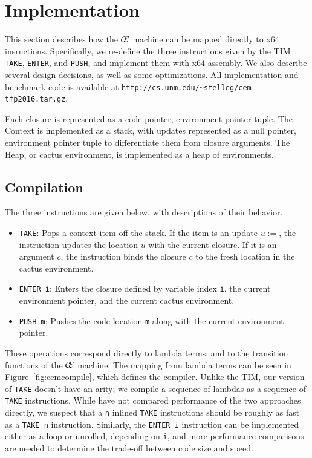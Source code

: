 \section{Implementation} \label{sec:impl}

This section describes how the $\mathcal{\mathcal{C} \mskip -4mu \mathcal{E}}$ machine can be mapped directly to
x64 insructions. Specifically, we re-define the three instructions given by
the TIM~\cite{TIM}: \texttt{TAKE}, \texttt{ENTER}, and \texttt{PUSH}, and
implement them with x64 assembly. We also describe several design decisions, as
well as some optimizations. All implementation and benchmark code is available
at \texttt{http://cs.unm.edu/\textasciitilde stelleg/cem-tfp2016.tar.gz}.

Each closure is represented as a code pointer, environment pointer tuple. The
Context is implemented as a stack, with updates represented as a null pointer,
environment pointer tuple to differentiate them from closure arguments. The
Heap, or cactus environment, is implemented as a heap of environments. 

\subsection{Compilation}
The three instructions are given below, with descriptions of their behavior. 

\begin{itemize}
\item \texttt{TAKE}: Pops a context item off the stack. If the item is an
update $u:=$, the instruction updates the location $u$ with the current closure.
If it is an argument $c$, the instruction binds the closure $c$ to the fresh
location in the cactus environment.
\item \texttt{ENTER i}: Enters the closure defined by variable index \texttt{i},
the current environment pointer, and the current cactus environment.  \item
\texttt{PUSH m}: Pushes the code location \texttt{m} along with the
current environment pointer. 
\end{itemize}

These operations correspond directly to lambda terms, and to the transition
functions of the $\mathcal{\mathcal{C} \mskip -4mu \mathcal{E}}$ machine. The mapping from lambda terms can be
seen in Figure~\ref{fig:cemcompile}, which defines the compiler. Unlike the TIM,
our version of \texttt{TAKE} doesn't have an arity; we compile a sequence of
lambdas as a sequence of \texttt{TAKE} instructions. While have not compared
performance of the two approaches directly, we suspect that a \texttt{n} inlined
\texttt{TAKE} instructions should be roughly as fast as a \texttt{TAKE n}
instruction.  Similarly, the \texttt{ENTER i} instruction can be implemented
either as a loop or unrolled, depending on \texttt{i}, and more performance
comparisons are needed to determine the trade-off between code size and speed.

